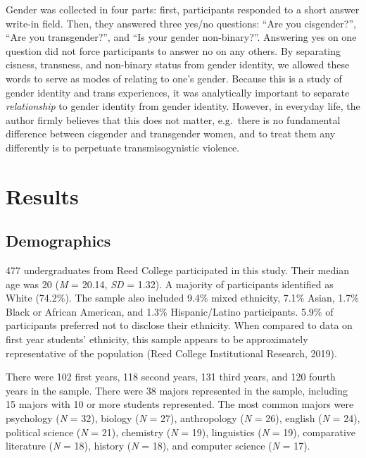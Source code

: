 \documentclass[12pt,twoside]{reedthesis}
\begin{document}
Gender was collected in four parts: first, participants responded to a short answer write-in field. Then, they answered three yes/no questions: ``Are you cisgender?'', ``Are you transgender?'', and ``Is your gender non-binary?''. Answering yes on one question did not force participants to answer no on any others. By separating cisness, transness, and non-binary status from gender identity, we allowed these words to serve as modes of relating to one's gender. Because this is a study of gender identity and trans experiences, it was analytically important to separate \emph{relationship} to gender identity from gender identity. However, in everyday life, the author firmly believes that this does not matter, e.g.~there is no fundamental difference between cisgender and transgender women, and to treat them any differently is to perpetuate transmisogynistic violence.

\hypertarget{results}{%
\chapter{Results}\label{results}}

\hypertarget{demographics}{%
\section{Demographics}\label{demographics}}

477 undergraduates from Reed College participated in this study. Their median age was 20 (\emph{M} = 20.14, \emph{SD} = 1.32). A majority of participants identified as White (74.2\%). The sample also included 9.4\% mixed ethnicity, 7.1\% Asian, 1.7\% Black or African American, and 1.3\% Hispanic/Latino participants. 5.9\% of participants preferred not to disclose their ethnicity. When compared to data on first year students' ethnicity, this sample appears to be approximately representative of the population (Reed College Institutional Research, 2019).

There were 102 first years, 118 second years, 131 third years, and 120 fourth years in the sample. There were 38 majors represented in the sample, including 15 majors with 10 or more students represented. The most common majors were psychology (\emph{N} = 32), biology (\emph{N} = 27), anthropology (\emph{N} = 26), english (\emph{N} = 24), political science (\emph{N} = 21), chemistry (\emph{N} = 19), linguistics (\emph{N} = 19), comparative literature (\emph{N} = 18), history (\emph{N} = 18), and computer science (\emph{N} = 17).
\end{document}
